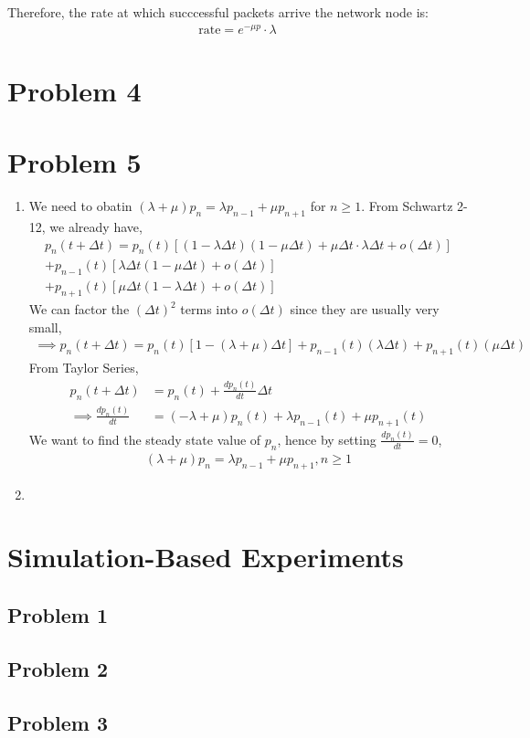\documentclass{article}
\begin{document}
		Therefore, the rate at which succcessful packets arrive the network node is:
		\begin{align*}
			\text{rate} = e^{-\mu p} \cdot \lambda
		\end{align*}

	\section*{Problem 4}

	\section*{Problem 5}
		\begin{enumerate}
			\item We need to obatin $(\lambda + \mu) p_{n} = \lambda p_{n-1} + \mu p_{n+1}$
				for $n \geqslant 1$. From Schwartz 2-12, we already have,
				\begin{gather*}
					p_{n}(t + \Delta t) = p_{n}(t) [ (1 - \lambda \Delta t)(1 - \mu \Delta t) + \mu \Delta t \cdot \lambda \Delta t + o(\Delta t) ] \\
					+ p_{n-1}(t) [ \lambda \Delta t (1 - \mu \Delta t) + o(\Delta t) ] \\
					+ p_{n+1}(t) [ \mu \Delta t (1 - \lambda \Delta t) + o(\Delta t) ]
				\end{gather*}
				We can factor the $(\Delta t)^{2}$ terms into $o(\Delta t)$ since they
				are usually very small,
				\begin{gather*}
					\implies p_{n}(t + \Delta t) = p_{n}(t) [1 - (\lambda + \mu) \Delta t] + p_{n-1}(t) (\lambda \Delta t) + p_{n+1}(t) (\mu \Delta t)
				\end{gather*}
				From Taylor Series,
				\begin{align*}
					p_{n}(t + \Delta t) &= p_{n}(t) + \frac{dp_{n}(t)}{dt} \Delta t \\
					\implies \frac{dp_{n}(t)}{dt} &= (-\lambda + \mu) p_{n}(t) + \lambda p_{n-1}(t) + \mu p_{n+1}(t)
				\end{align*}
				We want to find the steady state value of $p_{n}$, hence by setting $\frac{dp_{n}(t)}{dt} = 0$,
				\begin{align*}
					(\lambda + \mu) p_{n} = \lambda p_{n-1} + \mu p_{n+1}, n \geqslant 1
				\end{align*}
			\item %
		\end{enumerate}

\section*{Simulation-Based Experiments}
	\subsection*{Problem 1}

	\subsection*{Problem 2}

	\subsection*{Problem 3}
\end{document}
